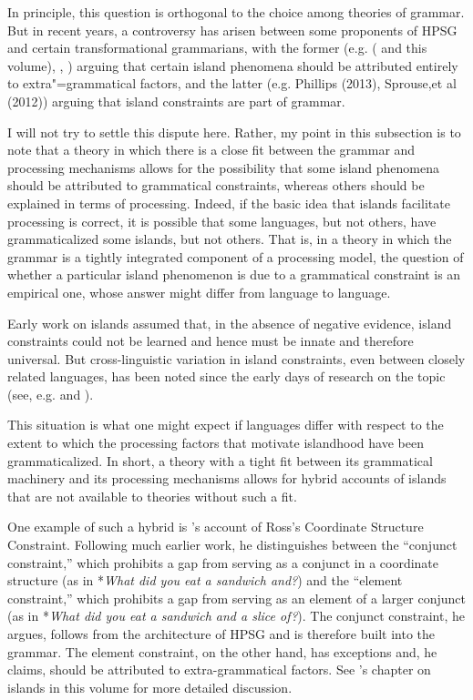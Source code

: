 \documentclass[a4paper]{article}
\begin{document}
In principle, this question is orthogonal to the choice among theories of grammar.  But in recent years, a controversy has arisen between some proponents of HPSG and certain transformational grammarians, with the former (e.g. \citeauthor{Chaves2012} (\citeyear{Chaves2012} and this volume), \citet{HofmeisterSag2010}, \citet{HofmeisterEtal2013}) arguing that certain island phenomena should be attributed entirely to extra"=grammatical factors, and the latter (e.g. Phillips (2013), Sprouse,et al (2012)) arguing that island constraints are part of grammar.

I will not try to settle this dispute here.  Rather, my point in this subsection is to note that a theory in which there is a close fit between the grammar and processing mechanisms allows for the possibility that some island phenomena should be attributed to grammatical constraints, whereas others should be explained in terms of processing.  Indeed, if the basic idea that islands facilitate processing is correct, it is possible that some languages, but not others, have grammaticalized some islands, but not others.  That is, in a theory in which the grammar is a tightly integrated component of a processing model, the question of whether a particular island phenomenon is due to a grammatical constraint is an empirical one, whose answer might differ from language to language. 

Early work on islands assumed that, in the absence of negative evidence, island constraints could not be learned and hence must be innate and therefore universal.  But cross-linguistic variation in island constraints, even between closely related languages, has been noted since the early days of research on the topic (see, e.g. \citet{Erteschik73a-u} and \citet{EngdahlEjerhed82}).

This situation is what one might expect if languages differ with respect to the extent to which the processing factors that motivate islandhood have been grammaticalized.  In short, a theory with a tight fit between its grammatical machinery and its processing mechanisms allows for hybrid accounts of islands that are not available to theories without such a fit.

One example of such a hybrid is \citeauthor{Chaves2012}'s \citeyearpar{Chaves2012} account of Ross's Coordinate Structure Constraint.  Following much earlier work, he distinguishes between the ``conjunct constraint,'' which prohibits a gap from serving as a conjunct in a coordinate structure (as in *{\it What did you eat a sandwich and?}) and the ``element constraint,'' which prohibits a gap from serving as an element of a larger conjunct (as in *{\it What did you eat a sandwich and a slice of?}).  The conjunct constraint, he argues, follows from the architecture of HPSG and is therefore built into the grammar.  The element constraint, on the other hand, has exceptions and, he claims, should be attributed to extra-grammatical factors.  See \citeauthor{Chaves2012}'s chapter on islands in this volume for more detailed discussion. 
\end{document}
